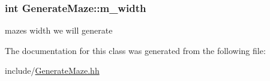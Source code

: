 \subsubsection[{m\+\_\+width}]{\setlength{\rightskip}{0pt plus 5cm}int Generate\+Maze\+::m\+\_\+width\hspace{0.3cm}{\ttfamily [private]}}\label{class_generate_maze_a0e05d9502767072ef2a613cf04cc9a20}
maze\textquotesingle{}s width we will generate 

The documentation for this class was generated from the following file\+:\begin{DoxyCompactItemize}
\item 
include/\hyperlink{_generate_maze_8hh}{Generate\+Maze.\+hh}\end{DoxyCompactItemize}
